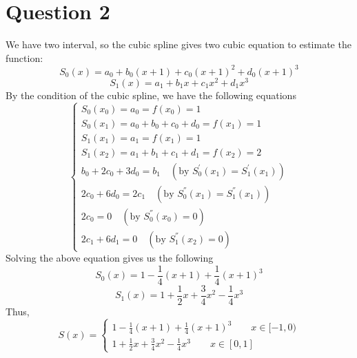 \documentclass[11pt]{article}
\begin{document}
\section*{Question 2}
We have two interval, so the cubic spline gives two cubic equation to estimate the function:
\[ S_0(x) = a_0 + b_0(x+1) + c_0(x+1)^2 + d_0(x+1)^3 \]   \[ S_1(x) = a_1 + b_1x + c_1x^2 + d_1x^3 \]
By the condition of the cubic spline, we have the following equations
\[
\begin{cases}
S_0(x_0) = a_0 = f(x_0) = 1\\
S_0(x_1) = a_0 + b_0 + c_0 + d_0 = f(x_1) = 1\\
S_1(x_1) = a_1 = f(x_1) = 1\\
S_1(x_2) = a_1 + b_1 + c_1 + d_1 = f(x_2) = 2\\
b_0 +2c_0 + 3d_0 = b_1 \quad \left(\text{by } S_0^{'}(x_1) = S_1^{'}(x_1)\right)\\
2c_0 + 6d_0 = 2c_1 \quad \left(\text{by } S_0^{''}(x_1) = S_1^{''}(x_1)\right)\\
2c_0 = 0 \quad \left(\text{by } S_0^{''}(x_0) = 0\right)\\
2c_1 + 6d_1 = 0 \quad \left(\text{by } S_1^{''}(x_2) =0 \right)
\end{cases}
\]
Solving the above equation gives us the following 
\[ S_0(x) = 1 - \frac{1}{4}(x+1) + \frac{1}{4}(x+1)^3 \]
\[ S_1(x) = 1 + \frac{1}{2}x + \frac{3}{4}x^2 - \frac{1}{4}x^3 \] 
Thus, \[ 
S(x)=
\begin{cases}
1 - \frac{1}{4}(x+1) + \frac{1}{4}(x+1)^3 \quad\quad x \in [-1,0)\\
1 + \frac{1}{2}x + \frac{3}{4}x^2 - \frac{1}{4}x^3 \quad\quad x \in [0,1]
\end{cases} \]
\pagebreak
\end{document}

